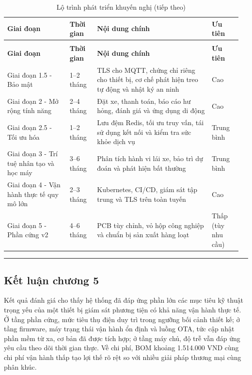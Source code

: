 \documentclass[a4paper]{extarticle}
\newcommand{\thesissettableid}[2]{%
  \renewcommand{\thetable}{#1}%
  \renewcommand{\theHtable}{#2}%
}
\begin{document}
{\thesissettableid{5.10}{tab-ch5-lo-trinh-phat-trien-khuyen-nghi}
\def\LTcaptype{table}
\begin{longtable}{|L{0.251\linewidth}|L{0.115\linewidth}|L{0.460\linewidth}|L{0.129\linewidth}|}
\caption{Lộ trình phát triển khuyến nghị}\label{tab:ch5-lo-trinh-phat-trien-khuyen-nghi}\\
\hline \textbf{Giai đoạn} & \textbf{Thời gian} & \textbf{Nội dung chính} & \textbf{Ưu tiên} \\
\hline
\endfirsthead
\caption[]{Lộ trình phát triển khuyến nghị (tiếp theo)}\\
\hline \textbf{Giai đoạn} & \textbf{Thời gian} & \textbf{Nội dung chính} & \textbf{Ưu tiên} \\
\hline
\endhead
\hline
\endfoot
\endlastfoot
Giai đoạn 1.5 - Bảo mật & 1--2 tháng & TLS cho MQTT, chứng chỉ riêng cho
thiết bị, cơ chế phát hiện treo tự động và nhật ký an ninh & Cao \\\hline
Giai đoạn 2 - Mở rộng tính năng & 2--4 tháng & Đặt xe, thanh toán, báo
cáo hư hỏng, đánh giá và ứng dụng di động & Cao \\\hline
Giai đoạn 2.5 - Tối ưu hóa & 1--2 tháng & Lưu đệm Redis, tối ưu truy
vấn, tái sử dụng kết nối và kiểm tra sức khỏe dịch vụ & Trung bình \\\hline
Giai đoạn 3 - Trí tuệ nhân tạo và học máy & 3--6 tháng & Phân tích hành vi lái xe, bảo trì dự
đoán và phát hiện bất thường & Trung bình \\\hline
Giai đoạn 4 - Vận hành thực tế quy mô lớn & 2--3 tháng & Kubernetes,
CI/CD, giám sát tập trung và TLS trên toàn tuyến & Cao \\\hline
Giai đoạn 5 - Phần cứng v2 & 4--6 tháng & PCB tùy chỉnh, vỏ hộp công
nghiệp và chuẩn bị sản xuất hàng loạt & Thấp (tùy nhu cầu) \\\hline
\end{longtable}
}


\begin{center}\rule{0.5\linewidth}{0.5pt}\end{center}

\subsection{Kết luận chương
5}\label{kux1ebft-luux1eadn-chux1b0ux1a1ng-5}

Kết quả đánh giá cho thấy hệ thống đã đáp ứng phần lớn các mục tiêu kỹ
thuật trọng yếu của một thiết bị giám sát phương tiện có khả năng vận
hành thực tế. Ở tầng phần cứng, mức tiêu thụ điện duy trì trong ngưỡng
bối cảnh thiết kế; ở tầng firmware, máy trạng thái vận hành ổn định và luồng OTA,
tức cập nhật phần mềm từ xa, cơ
bản đã được tích hợp; ở tầng máy chủ, độ trễ vẫn đáp ứng yêu cầu theo dõi
thời gian thực. Về chi phí, BOM khoảng 1.514.000 VND cùng chi phí vận
hành thấp tạo lợi thế rõ rệt so với nhiều giải pháp thương mại cùng phân
khúc.
\end{document}
